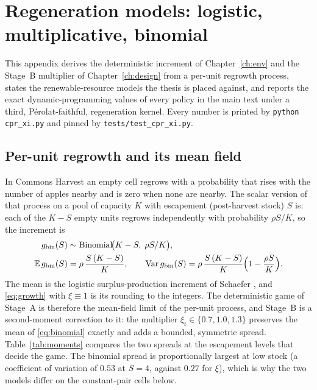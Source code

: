 \chapter{Regeneration models: logistic, multiplicative, binomial}
\label{app:binomial}

This appendix derives the deterministic increment of Chapter~\ref{ch:env}
and the Stage~B multiplier of Chapter~\ref{ch:design} from a per-unit
regrowth process, states the renewable-resource models the thesis is
placed against, and reports the exact dynamic-programming values of every
policy in the main text under a third, Pérolat-faithful, regeneration
kernel.
Every number is printed by \texttt{python cpr\_xi.py} and pinned by
\texttt{tests/test\_cpr\_xi.py}.

\section{Per-unit regrowth and its mean field}
\label{app:meanfield}

In Commons Harvest \cite{perolat2017} an empty cell regrows with a
probability that rises with the number of apples nearby and is zero when
none are nearby.
The scalar version of that process on a pool of capacity \(K\) with
escapement (post-harvest stock) \(S\) is: each of the \(K-S\) empty units
regrows independently with probability \(\rho S/K\), so the increment is
\begin{equation}
  \begin{aligned}
  g_{\mathrm{bin}}(S)&\sim\operatorname{Binomial}\!\bigl(K-S,\;\rho S/K\bigr),\\
  \mathbb{E}\,g_{\mathrm{bin}}(S)&=\rho\,\frac{S\,(K-S)}{K},
  \qquad
  \operatorname{Var}g_{\mathrm{bin}}(S)=\rho\,\frac{S\,(K-S)}{K}\Bigl(1-\frac{\rho S}{K}\Bigr).
  \end{aligned}
  \label{eq:binomial}
\end{equation}
The mean is the logistic surplus-production increment of Schaefer
\cite{schaefer1954}, and \eqref{eq:growth} with \(\xi\equiv 1\) is its
rounding to the integers.
The deterministic game of Stage~A is therefore the mean-field limit of the
per-unit process, and Stage~B is a second-moment correction to it: the
multiplier \(\xi_t\in\{0.7,1.0,1.3\}\) preserves the mean of
\eqref{eq:binomial} exactly and adds a bounded, symmetric spread.
Table~\ref{tab:moments} compares the two spreads at the escapement levels
that decide the game.
The binomial spread is proportionally largest at low stock (a coefficient
of variation of \(0.53\) at \(S=4\), against \(0.27\) for \(\xi\)), which
is why the two models differ on the constant-pair cells below.

